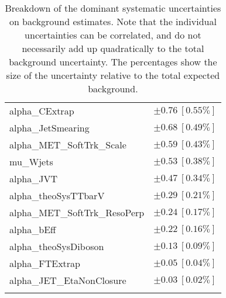 \begin{table}
\begin{center}
\begin{tabular*}{\textwidth}{@{\extracolsep{\fill}}lc}
alpha\_CExtrap         & $\pm 0.76\ [0.55\%] $       \\
alpha\_JetSmearing         & $\pm 0.68\ [0.49\%] $       \\
alpha\_MET\_SoftTrk\_Scale         & $\pm 0.59\ [0.43\%] $       \\
mu\_Wjets         & $\pm 0.53\ [0.38\%] $       \\
alpha\_JVT         & $\pm 0.47\ [0.34\%] $       \\
alpha\_theoSysTTbarV         & $\pm 0.29\ [0.21\%] $       \\
alpha\_MET\_SoftTrk\_ResoPerp         & $\pm 0.24\ [0.17\%] $       \\
alpha\_bEff         & $\pm 0.22\ [0.16\%] $       \\
alpha\_theoSysDiboson         & $\pm 0.13\ [0.09\%] $       \\
alpha\_FTExtrap         & $\pm 0.05\ [0.04\%] $       \\
alpha\_JET\_EtaNonClosure         & $\pm 0.03\ [0.02\%] $       \\
\noalign{\smallskip}\hline\noalign{\smallskip}
\end{tabular*}
\end{center}
\caption[Breakdown of uncertainty on background estimates]{
Breakdown of the dominant systematic uncertainties on background estimates.
Note that the individual uncertainties can be correlated, and do not necessarily add up quadratically to 
the total background uncertainty. The percentages show the size of the uncertainty relative to the total expected background.
\label{table.results.bkgestimate.uncertainties.VRTopBTW}}
\end{table}
%